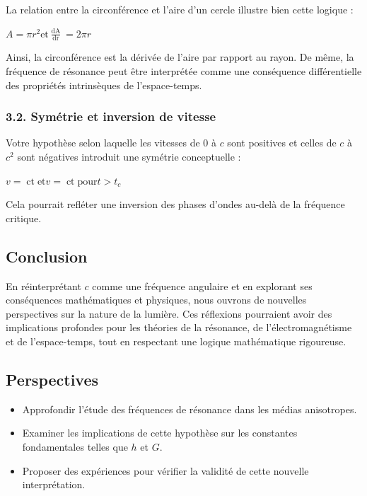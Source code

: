 \documentclass{article}
\newcommand{\tmop}[1]{\ensuremath{\operatorname{#1}}}
\newcommand{\nonconverted}[1]{\mbox{}}
\begin{document}
La relation entre la circonf{\'e}rence et l'aire d'un cercle illustre bien
cette logique :

$A = \pi r^2 \text{et} \frac{\tmop{dA}}{\tmop{dr}} = 2 \pi r$

Ainsi, la circonf{\'e}rence est la d{\'e}riv{\'e}e de l'aire par rapport au
rayon. De m{\^e}me, la fr{\'e}quence de r{\'e}sonance peut {\^e}tre
interpr{\'e}t{\'e}e comme une cons{\'e}quence diff{\'e}rentielle des
propri{\'e}t{\'e}s intrins{\`e}ques de l'espace-temps.

\subsubsection*{3.2. Sym{\'e}trie et inversion de vitesse}

Votre hypoth{\`e}se selon laquelle les vitesses de 0 {\`a} $c$ sont positives
et celles de $c$ {\`a} $c^2$ sont n{\'e}gatives introduit une sym{\'e}trie
conceptuelle :

$v = \tmop{ct} \text{et} v = \nonconverted{minus} \tmop{ct} \text{pour} t >
t_c$

Cela pourrait refl{\'e}ter une inversion des phases d'ondes au-del{\`a} de la
fr{\'e}quence critique.

\hrulefill

\subsection*{Conclusion}

En r{\'e}interpr{\'e}tant $c$ comme une fr{\'e}quence angulaire et en
explorant ses cons{\'e}quences math{\'e}matiques et physiques, nous ouvrons de
nouvelles perspectives sur la nature de la lumi{\`e}re. Ces r{\'e}flexions
pourraient avoir des implications profondes pour les th{\'e}ories de la
r{\'e}sonance, de l'{\'e}lectromagn{\'e}tisme et de l'espace-temps, tout en
respectant une logique math{\'e}matique rigoureuse.

\subsection*{Perspectives}

\begin{itemize}
  \item Approfondir l'{\'e}tude des fr{\'e}quences de r{\'e}sonance dans les
  m{\'e}dias anisotropes.
  
  \item Examiner les implications de cette hypoth{\`e}se sur les constantes
  fondamentales telles que $h$ et $G$.
  
  \item Proposer des exp{\'e}riences pour v{\'e}rifier la validit{\'e} de
  cette nouvelle interpr{\'e}tation.
\end{itemize}
\end{document}
